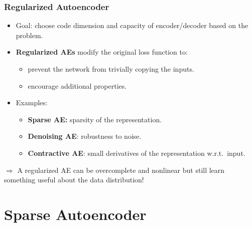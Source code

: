     

  \begin{frame}

  \frametitle{Regularized Autoencoder}
  
 
    \begin{itemize}
       \item Goal: choose code dimension and capacity of encoder/decoder based on the problem.
       \item \textbf{Regularized AEs} modify the original loss function to:
       \begin{itemize}
       \item prevent the network from trivially copying the inputs.
       \item encourage additional properties.
       \end{itemize}
       
     
        \item Examples:
            \begin{itemize}
                \item \textbf{Sparse AE:} sparsity of the representation.
                \item \textbf{Denoising AE}: robustness to noise.%
                \item \textbf{Contractive AE}: small derivatives of the representation w.r.t.~input.
            \end{itemize}
   
    \end{itemize} 
    $\Rightarrow$ 
    A regularized AE can be overcomplete and nonlinear but still learn something useful about the data distribution!  
  
  
\end{frame}


\section{Sparse Autoencoder}

